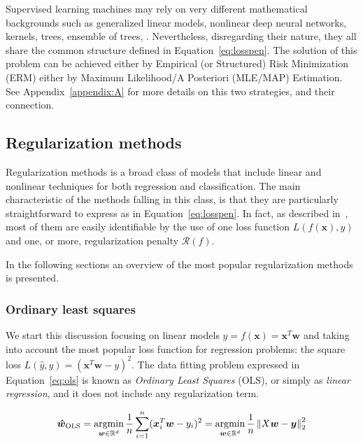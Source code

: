 
	    Supervised learning machines may rely on very different mathematical backgrounds such as generalized linear models, nonlinear deep neural networks, kernels, trees, ensemble of trees, \etc. Nevertheless, disregarding their nature, they all share the common structure defined in Equation~\eqref{eq:losspen}.
	    The solution of this problem can be achieved either by Empirical (or Structured) Risk Minimization (\ac{ERM}) either by Maximum Likelihood/A Posteriori (\ac{MLE}/\ac{MAP}) Estimation. See Appendix~\ref{appendix:A} for more details on this two strategies, and their connection.

	    \subsection{Regularization methods} \label{subsec:regularization_methods}
	    Regularization methods is a broad class of models that include linear and nonlinear techniques for both regression and classification. The main characteristic of the methods falling in this class, is that they are particularly straightforward to express as in Equation~\eqref{eq:losspen}. In fact, as described in~\cite{evgeniou2000regularization}, most of them are easily identifiable by the use of one loss function $L(f(\bm{x}), y)$ and one, or more, regularization penalty $\mathcal{R}(f)$.

	    In the following sections an overview of the most popular regularization methods is presented.

			\subsubsection{Ordinary least squares} \label{sec:ols}
			We start this discussion focusing on linear models $\hat y = f(\bm{x})=\bm{x}^T\bm{w}$ and taking into account the most popular loss function for regression problems: the square loss $L(\hat y, y) = (\bm{x}^T\bm{w}-y)^2$. The data fitting problem expressed in Equation~\eqref{eq:ols} is known as \textit{Ordinary Least Squares} (\ac{OLS}), or simply as \textit{linear regression}, and it does not include any regularization term.

			\begin{equation} \label{eq:ols}
				\bm{\hat w}_{\text{OLS}} = \mathop{\mathrm{argmin}}\limits_{\bm{w} \in \mathbb{R}^d} \frac{1}{n} \sum_{i=1}^n (\bm{x}_i^T\bm{w} - y_i)^2 = \mathop{\mathrm{argmin}}\limits_{\bm{w} \in \mathbb{R}^d} \frac{1}{n} \left\lVert X\bm{w} - \bm{y}\right\rVert_2^2
			\end{equation}

